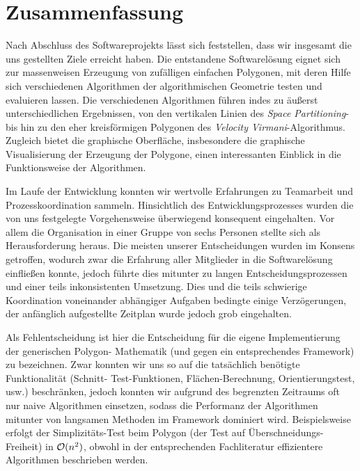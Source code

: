 \section{Zusammenfassung}

  Nach Abschluss des Softwareprojekts lässt sich feststellen, dass wir insgesamt 
  die uns gestellten Ziele erreicht haben.
  Die entstandene Softwarelösung eignet sich zur
  massenweisen Erzeugung von zufälligen einfachen Polygonen, mit deren Hilfe
  sich verschiedenen Algorithmen der algorithmischen Geometrie testen und
  evaluieren lassen. Die verschiedenen Algorithmen führen indes zu äußerst
  unterschiedlichen Ergebnissen, von den vertikalen Linien des \emph{Space
  Partitioning}- bis hin zu den eher kreisförmigen Polygonen des
  \emph{Velocity Virmani}-Algorithmus. Zugleich bietet die graphische
  Oberfläche, insbesondere die graphische Visualisierung der Erzeugung der
  Polygone, einen interessanten Einblick in die Funktionsweise der
  Algorithmen.

  Im Laufe der Entwicklung konnten wir wertvolle Erfahrungen zu Teamarbeit und
  Prozesskoordination sammeln. Hinsichtlich des Entwicklungsprozesses wurden die
  von uns festgelegte Vorgehensweise überwiegend konsequent eingehalten. Vor 
  allem
  die Organisation in einer Gruppe von sechs Personen stellte sich als
  Herausforderung heraus. Die meisten unserer Entscheidungen wurden im Konsens
  getroffen, wodurch zwar die Erfahrung aller Mitglieder in die Softwarelösung
  einfließen konnte, jedoch führte dies mitunter zu langen Entscheidungsprozessen 
  und
  einer teils inkonsistenten Umsetzung. Dies und die teils schwierige
  Koordination voneinander abhängiger Aufgaben bedingte einige Verzögerungen,
  der anfänglich aufgestellte Zeitplan wurde jedoch grob eingehalten.

  Als Fehlentscheidung ist hier die
  Entscheidung für die eigene Implementierung der generischen Polygon-
  Mathematik (und gegen ein entsprechendes Framework) zu bezeichnen. Zwar
  konnten wir uns so auf die tatsächlich benötigte Funktionalität (Schnitt-
  Test-Funktionen, Flächen-Berechnung, Orientierungstest, usw.) beschränken,
  jedoch konnten wir aufgrund des begrenzten Zeitraums oft nur naive
  Algorithmen einsetzen, sodass die Performanz der Algorithmen mitunter von
  langsamen Methoden im Framework dominiert wird. Beispielsweise erfolgt der
  Simplizitäts-Test beim Polygon (der Test auf Überschneidungs-Freiheit)
  in $\mathcal{O}(n^2)$, obwohl in der entsprechenden Fachliteratur effizientere
  Algorithmen beschrieben werden.

